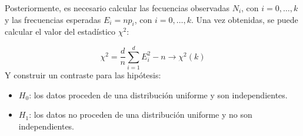 Posteriormente, es necesario calcular las fecuencias observadas $N_i$, con $i=0, \ldots, k$ y las frecuencias esperadas $E_i=np_i$, con $i=0, \ldots, k$. Una vez obtenidas, se puede calcular el valor del estadístico $\chi^2$:

\[
\chi^2=\frac{d}{n}\sum_{i=1}^dE_i^2-n\longrightarrow \chi^2(k)
\]
Y construir un contraste para las hipótesis:
\begin{itemize}
\item $H_0$: los datos proceden de una distribución uniforme y son independientes.
\item $H_1$: los datos no proceden de una distribución uniforme y no son independientes.
\end{itemize}